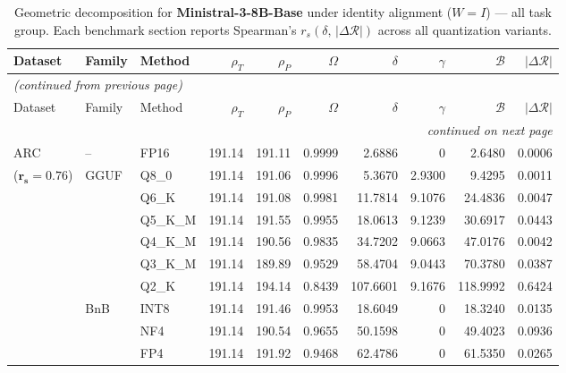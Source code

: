 \begingroup
\small
\setlength{\tabcolsep}{4pt}
\renewcommand{\arraystretch}{1.05}
\setlength{\LTcapwidth}{\textwidth}
\begin{longtable}{ll l rrrrrrr}
\caption{Geometric decomposition for \textbf{Ministral-3-8B-Base} under identity alignment ($W{=}I$) --- all task group. Each benchmark section reports Spearman's $r_s(\delta,\,|\Delta\mathcal{R}|)$ across all quantization variants.}\label{tab:mistral_decomposition_all}\\
\toprule
Dataset & Family & Method & $\rho_T$ & $\rho_P$ & $\Omega$ & $\delta$ & $\gamma$ & $\mathcal{B}$ & $|\Delta\mathcal{R}|$ \\
\midrule
\endfirsthead
\multicolumn{10}{l}{\small\itshape (continued from previous page)}\\
\toprule
Dataset & Family & Method & $\rho_T$ & $\rho_P$ & $\Omega$ & $\delta$ & $\gamma$ & $\mathcal{B}$ & $|\Delta\mathcal{R}|$ \\
\midrule
\endhead
\midrule
\multicolumn{10}{r}{\small\itshape continued on next page}\\
\endfoot
\bottomrule
\endlastfoot
ARC & -- & FP16 & 191.14 & 191.11 & 0.9999 & 2.6886 & \cellcolor{cyan!12} $0$ & 2.6480 & 0.0006 \\
{\small ($\mathbf{r_s{=}0.76}$)} & GGUF & Q8\_0 & 191.14 & 191.06 & 0.9996 & 5.3670 & 2.9300 & 9.4295 & 0.0011 \\
 &  & Q6\_K & 191.14 & 191.08 & 0.9981 & 11.7814 & 9.1076 & 24.4836 & 0.0047 \\
 &  & Q5\_K\_M & 191.14 & 191.55 & 0.9955 & 18.0613 & 9.1239 & 30.6917 & 0.0443 \\
 &  & Q4\_K\_M & 191.14 & 190.56 & 0.9835 & 34.7202 & 9.0663 & 47.0176 & 0.0042 \\
 &  & Q3\_K\_M & 191.14 & 189.89 & 0.9529 & 58.4704 & 9.0443 & 70.3780 & 0.0387 \\
 &  & Q2\_K & 191.14 & 194.14 & \cellcolor{red!18} 0.8439 & \cellcolor{red!18} 107.6601 & 9.1676 & \cellcolor{red!18} 118.9992 & \cellcolor{red!18} 0.6424 \\
 & BnB & INT8 & 191.14 & 191.46 & 0.9953 & 18.6049 & \cellcolor{cyan!12} $0$ & 18.3240 & 0.0135 \\
 &  & NF4 & 191.14 & 190.54 & 0.9655 & 50.1598 & \cellcolor{cyan!12} $0$ & 49.4023 & 0.0936 \\
 &  & FP4 & 191.14 & 191.92 & \cellcolor{red!18} 0.9468 & \cellcolor{red!18} 62.4786 & \cellcolor{cyan!12} $0$ & \cellcolor{red!18} 61.5350 & \cellcolor{red!18} 0.0265 \\

\end{longtable}
